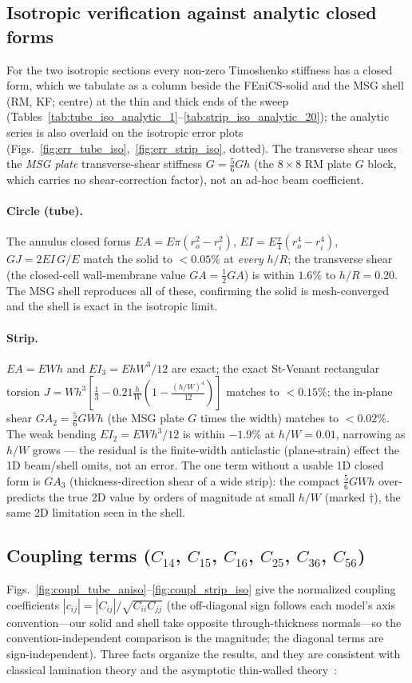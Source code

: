 \documentclass[11pt]{article}
\begin{document}
\subsection{Isotropic verification against analytic closed forms}
For the two isotropic sections every non-zero Timoshenko stiffness has a
closed form, which we tabulate as a column beside the FEniCS-solid and the MSG
shell (RM, KF; centre) at the thin and thick ends of the sweep
(Tables~\ref{tab:tube_iso_analytic_1}--\ref{tab:strip_iso_analytic_20}); the
analytic series is also overlaid on the isotropic error plots
(Figs.~\ref{fig:err_tube_iso},~\ref{fig:err_strip_iso}, dotted). The transverse
shear uses the \emph{MSG plate} transverse-shear stiffness $G=\tfrac56 Gh$ (the
$8\times8$ RM plate $G$ block, which carries no shear-correction factor), not an
ad-hoc beam coefficient.

\paragraph{Circle (tube).} The annulus closed forms
$EA=E\pi(r_o^2-r_i^2)$, $EI=E\tfrac\pi4(r_o^4-r_i^4)$, $GJ=2EI\,G/E$ match the
solid to $<0.05\%$ at \emph{every} $h/R$; the transverse shear (the closed-cell
wall-membrane value $GA=\tfrac12 GA$) is within $1.6\%$ to $h/R=0.20$. The MSG
shell reproduces all of these, confirming the solid is mesh-converged and the
shell is exact in the isotropic limit.

\paragraph{Strip.} $EA=EWh$ and $EI_3=EhW^3/12$ are exact; the exact St-Venant
rectangular torsion $J=Wh^3[\tfrac13-0.21\tfrac hW(1-\tfrac{(h/W)^4}{12})]$ matches
to $<0.15\%$; the in-plane shear $GA_2=\tfrac56 GWh$ (the MSG plate $G$ times the
width) matches to $<0.02\%$. The weak bending $EI_2=EWh^3/12$ is within $-1.9\%$ at
$h/W=0.01$, narrowing as $h/W$ grows --- the residual is the finite-width
anticlastic (plane-strain) effect the 1D beam/shell omits, not an error. The one
term without a usable 1D closed form is $GA_3$ (thickness-direction shear of a wide
strip): the compact $\tfrac56 GWh$ over-predicts the true 2D value by orders of
magnitude at small $h/W$ (marked $\dagger$), the same 2D limitation seen in the
shell.

\subsection{Coupling terms ($C_{14}$, $C_{15}$, $C_{16}$, $C_{25}$, $C_{36}$, $C_{56}$)}
Figs.~\ref{fig:coupl_tube_aniso}--\ref{fig:coupl_strip_iso} give the normalized
coupling coefficients $|c_{ij}|=|C_{ij}|/\sqrt{C_{ii}C_{jj}}$ (the off-diagonal
sign follows each model's axis convention---our solid and shell take opposite
through-thickness normals---so the convention-independent comparison is the
magnitude; the diagonal terms are sign-independent). Three facts organize the
results, and they are consistent with classical lamination theory and the
asymptotic thin-walled theory~\cite{deoyu2020,royyu2006,bagla2025}:
\end{document}
